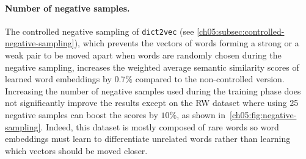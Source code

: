     \paragraph{Number of negative samples.}
      The controlled negative sampling of \texttt{dict2vec} (see
      \autoref{ch05:subsec:controlled-negative-sampling}), which prevents the
      vectors of words forming a strong or a weak pair to be moved apart when
      words are randomly chosen during the negative sampling, increases the
      weighted average semantic similarity scores of learned word embeddings by
      $0.7\%$ compared to the non-controlled version. Increasing the number of
      negative samples used during the training phase does not significantly
      improve the results except on the RW dataset where using 25 negative
      samples can boost the scores by $10\%$, as shown
      in~\autoref{ch05:fig:negative-sampling}. Indeed, this dataset is mostly
      composed of rare words so word embeddings must learn to differentiate
      unrelated words rather than learning which vectors should be moved closer.

